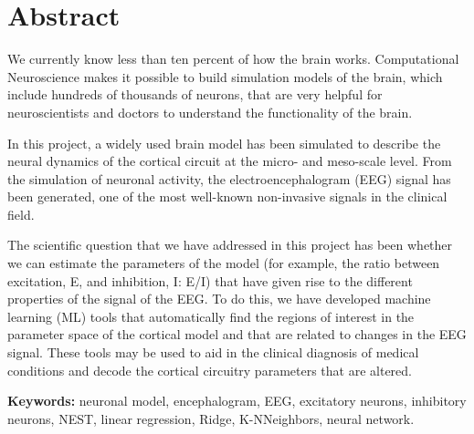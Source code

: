 \chapter*{Abstract}

We currently know less than ten percent of how the brain works. Computational Neuroscience makes it possible to build simulation models of the brain, which include hundreds of thousands of neurons, that are very helpful for neuroscientists and doctors to understand the functionality of the brain.

In this project, a widely used brain model has been simulated to describe the neural dynamics of the cortical circuit at the micro- and meso-scale level. From the simulation of neuronal activity, the electroencephalogram (EEG) signal has been generated, one of the most well-known non-invasive signals in the clinical field.

The scientific question that we have addressed in this project has been whether we can estimate the parameters of the model (for example, the ratio between excitation, E, and inhibition, I: E/I) that have given rise to the different properties of the signal of the EEG. To do this, we have developed machine learning (ML) tools that automatically find the regions of interest in the parameter space of the cortical model and that are related to changes in the EEG signal. These tools may be used to aid in the clinical diagnosis of medical conditions and decode the cortical circuitry parameters that are altered.

\textbf{Keywords:} neuronal model, encephalogram, EEG, excitatory neurons, inhibitory neurons, NEST, linear regression, Ridge, K-NNeighbors, neural network.